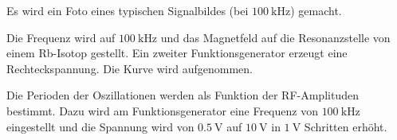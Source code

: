 
Es wird ein Foto eines typischen Signalbildes (bei $\SI{100}{\kilo\hertz}$) gemacht. %



Die Frequenz wird auf $\SI{100}{\kilo\hertz}$ und das Magnetfeld auf die Resonanzstelle von einem Rb-Isotop gestellt. Ein zweiter Funktionsgenerator erzeugt eine Rechteckspannung. %
Die Kurve wird aufgenommen. %

Die Perioden der Oszillationen werden als Funktion der RF-Amplituden bestimmt. Dazu wird am Funktionsgenerator eine Frequenz von $\SI{100}{\kilo\hertz}$ eingestellt und die Spannung wird von $\SI{0.5}{\volt}$ auf $\SI{10}{\volt}$ in $\SI{1}{\volt}$ Schritten erhöht.

